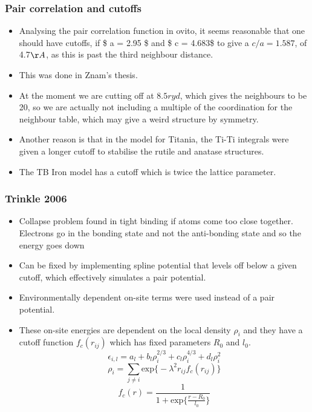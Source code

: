 \documentclass[11pt]{article}
\begin{document}
\subsubsection{Pair correlation and cutoffs}
\label{sec:orge93930d}
\begin{itemize}
\item Analysing the pair correlation function in ovito, it seems reasonable
that one should have cutoffs, if \$ a = 2.95 \$ and \$ c = 4.683\$ to give a
\(c/a = 1.587\), of 4.7\(\AA\), as this is past the third neighbour
distance.
\item This was done in Znam's thesis.
\item At the moment we are cutting off at \(8.5 ryd\), which gives the
neighbours to be 20, so we are actually not including a multiple of the
coordination for the neighbour table, which may give a weird structure
by symmetry.
\item Another reason is that in the model for Titania, the Ti-Ti integrals
were given a longer cutoff to stabilise the rutile and anatase
structures.
\item The TB Iron model has a cutoff which is twice the lattice parameter.
\end{itemize}
\subsubsection{Trinkle 2006}
\label{sec:org8eebce7}
\begin{itemize}
\item Collapse problem found in tight binding if atoms come too close
together. Electrons go in the bonding state and not the anti-bonding
state and so the energy goes down
\item Can be fixed by implementing spline potential that levels off below a
given cutoff, which effectively simulates a pair potential.
\item Environmentally dependent on-site terms were used instead of a pair potential.
\item These on-site energies are dependent on the local density \(\rho_{i}\) and
they have a cutoff function \(f_{c}(r_{ij})\) which has fixed parameters
\(R_{0}\) and \(l_{0}\).\[
      \epsilon_{i,l} = a_{l} + b_{l}\rho_{i}^{2/3} + c_{l}\rho_{i}^{4/3} +
      d_{l}\rho_{i}^{2}\] 
\[ \rho_{i} = \sum_{j \neq i} \text{exp}\big\{ -\lambda^{2} r_{ij}
      f_{c}(r_{ij}) \big\} \]
\[ f_{c}(r) = \frac{1}{1 + \text{exp}\Big\{  \frac{r-R_{0}}{l_{0}}\Big\}
      }\]
\end{itemize}
\end{document}
